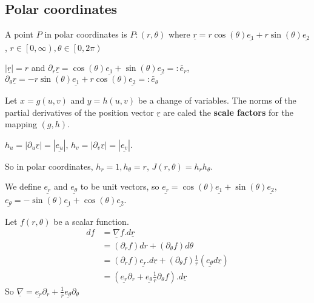 \subsection{Polar coordinates}

\begin{definition}
	A point $P$ in polar coordinates is $P: (r, \theta)$ where $\underline{r} = r \cos (\theta) \underline{e_1} + r \sin (\theta) \underline{e_2}$, $r \in \left[0, \infty\right), \theta \in \left[ 0, 2 \pi \right)$

	$|\underline{r}| = r$ and $\partial_r \underline{r} = \cos(\theta) \underline{e_1} + \sin(\theta) \underline{e_2} =: \tilde{e_r}$, $\partial_{\theta} \underline{r} = - r \sin(\theta) \underline{e_1} + r \cos(\theta) \underline{e_2} =: \tilde{e_{\theta}}$
\end{definition}

\begin{definition}
	Let $x = g(u, v)$ and $y = h(u, v)$ be a change of variables. The norms of the partial derivatives of the position vector $\underline{r}$ are caled the \textbf{scale factors} for the mapping $(g, h)$.
\end{definition}

\begin{definition}
	$h_u = |\partial_u \underline{r}| = |\underline{e_u}|$, $h_v = |\partial_v \underline{r}| = |\underline{e_v}|$.

	So in polar coordinates, $h_r = 1, h_{\theta} = r$, $J(r, \theta) = h_r h_{\theta}$.
\end{definition}

\begin{definition}
	We define $\underline{e_r}$ and $\underline{e_{\theta}}$ to be unit vectors, so $\underline{e_r} = \cos(\theta) \underline{e_1} + \sin(\theta) \underline{e_2}$, $\underline{e_{\theta}} = -\sin(\theta) \underline{e_1} + \cos(\theta) \underline{e_2}$.
\end{definition}

\begin{definition}
	Let $f(r, \theta)$ be a scalar function.
	\[
		\begin{aligned}
			df
				& = \underline{\nabla} f . d \underline{r} \\
				& = (\partial_r f) dr + (\partial_{\theta} f) d \theta \\
				& = (\partial_r f) \underline{e_r} . d\underline{r} + (\partial_{\theta} f) \frac{1}{r} (\underline{e_{\theta}} d \underline{r}) \\
				& = (\underline{e_r} \partial_r + \underline{e_{\theta}} \frac{1}{r} \partial_{\theta} f) . d\underline{r}
		\end{aligned}
	\]
	So $\underline{\nabla} = \underline{e_r} \partial_r + \frac{1}{r} \underline{e_{\theta}} \partial_{\theta}$
\end{definition}

